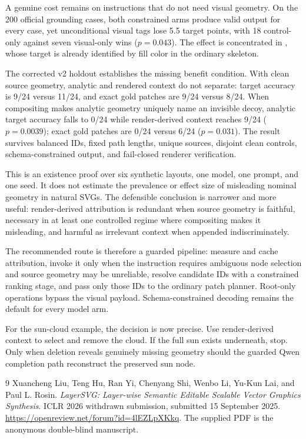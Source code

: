 \documentclass[10pt,a4paper]{article}
\newcommand{\code}[1]{\texttt{\detokenize{#1}}}
\begin{document}
A genuine cost remains on instructions that do not need visual geometry. On
the 200 official grounding cases, both constrained arms produce valid output
for every case, yet unconditional visual tags lose 5.5 target points, with 18
control-only against seven visual-only wins (\(p=0.043\)). The effect is
concentrated in \code{change_color}, whose target is already identified by
fill color in the ordinary skeleton.

The corrected v2 holdout establishes the missing benefit condition. With clean
source geometry, analytic and rendered context do not separate: target
accuracy is 9/24 versus 11/24, and exact gold patches are 9/24 versus 8/24.
When compositing makes analytic geometry uniquely name an invisible decoy,
analytic target accuracy falls to 0/24 while render-derived context reaches
9/24 (\(p=0.0039\)); exact gold patches are 0/24 versus 6/24
(\(p=0.031\)). The result survives balanced IDs, fixed path lengths, unique
sources, disjoint clean controls, schema-constrained output, and fail-closed
renderer verification.

This is an existence proof over six synthetic layouts, one model, one prompt,
and one seed. It does not estimate the prevalence or effect size of misleading
nominal geometry in natural SVGs. The defensible conclusion is narrower and
more useful: render-derived attribution is redundant when source geometry is
faithful, necessary in at least one controlled regime where compositing makes
it misleading, and harmful as irrelevant context when appended
indiscriminately.

The recommended route is therefore a guarded pipeline: measure and cache
attribution, invoke it only when the instruction requires ambiguous node
selection and source geometry may be unreliable, resolve candidate IDs with a
constrained ranking stage, and pass only those IDs to the ordinary patch
planner. Root-only operations bypass the visual payload. Schema-constrained
decoding remains the default for every model arm.

For the sun-cloud example, the decision is now precise. Use render-derived
context to select and remove the cloud. If the full sun exists underneath, stop.
Only when deletion reveals genuinely missing geometry should the guarded Qwen
completion path reconstruct the preserved sun node.

\begin{thebibliography}{9}
Xuancheng Liu, Teng Hu, Ran Yi, Chenyang Shi, Wenbo Li, Yu-Kun Lai, and
Paul L. Rosin.
\newblock \emph{LayerSVG: Layer-wise Semantic Editable Scalable Vector Graphics
Synthesis}.
\newblock ICLR 2026 withdrawn submission, submitted 15 September 2025.
\newblock \url{https://openreview.net/forum?id=4lEZLpXKkq}.
\newblock The supplied PDF is the anonymous double-blind manuscript.
\end{thebibliography}
\end{document}
